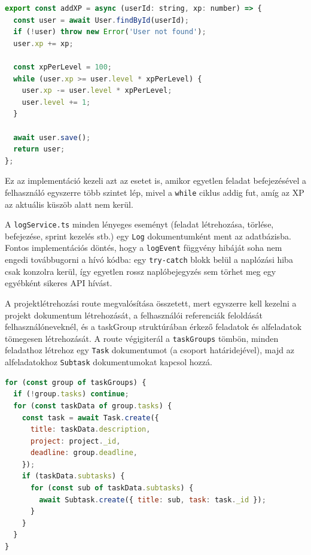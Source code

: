 \begin{lstlisting}[language=JavaScript, caption={XP jóváírási logika (services/xpService.ts)}]
export const addXP = async (userId: string, xp: number) => {
  const user = await User.findById(userId);
  if (!user) throw new Error('User not found');
  user.xp += xp;

  const xpPerLevel = 100;
  while (user.xp >= user.level * xpPerLevel) {
    user.xp -= user.level * xpPerLevel;
    user.level += 1;
  }

  await user.save();
  return user;
};
\end{lstlisting}

Ez az implementáció kezeli azt az esetet is, amikor egyetlen feladat befejezésével a felhasználó egyszerre több szintet lép, mivel a \texttt{while} ciklus addig fut, amíg az XP az aktuális küszöb alatt nem kerül.


A \texttt{logService.ts} minden lényeges eseményt (feladat létrehozása, törlése, befejezése, sprint kezelés stb.) egy \texttt{Log} dokumentumként ment az adatbázisba. Fontos implementációs döntés, hogy a \texttt{logEvent} függvény hibáját soha nem engedi továbbugorni a hívó kódba: egy \texttt{try-catch} blokk belül a naplózási hiba csak konzolra kerül, így egyetlen rossz naplóbejegyzés sem törhet meg egy egyébként sikeres API hívást.


A projektlétrehozási route megvalósítása összetett, mert egyszerre kell kezelni a projekt dokumentum létrehozását, a felhasználói referenciák feloldását felhasználóneveknél, és a taskGroup struktúrában érkező feladatok és alfeladatok tömegesen létrehozását. A route végigiterál a \texttt{taskGroups} tömbön, minden feladathoz létrehoz egy \texttt{Task} dokumentumot (a csoport határidejével), majd az alfeladatokhoz \texttt{Subtask} dokumentumokat kapcsol hozzá.

\begin{lstlisting}[language=JavaScript, caption={TaskGroup feldolgozás projektlétrehozáskor}]
for (const group of taskGroups) {
  if (!group.tasks) continue;
  for (const taskData of group.tasks) {
    const task = await Task.create({
      title: taskData.description,
      project: project._id,
      deadline: group.deadline,
    });
    if (taskData.subtasks) {
      for (const sub of taskData.subtasks) {
        await Subtask.create({ title: sub, task: task._id });
      }
    }
  }
}
\end{lstlisting}

